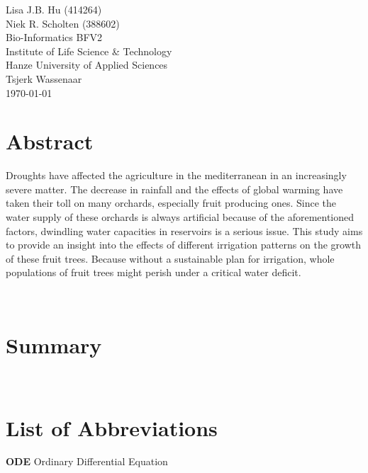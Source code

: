 \normalsize
\vspace*{\fill}
\begin{flushright}
Lisa J.B. Hu (414264)\\
Niek R. Scholten (388602)\\
Bio-Informatics BFV2\\
Institute of Life Science \& Technology\\
Hanze University of Applied Sciences\\
Tsjerk Wassenaar\\
\today
\end{flushright}
\newpage

\section*{Abstract}

Droughts have affected the agriculture in the mediterranean in an increasingly severe matter.
The decrease in rainfall and the effects of global warming have taken their toll on many orchards, especially fruit producing ones.
Since the water supply of these orchards is always artificial because of the aforementioned factors, dwindling water capacities in reservoirs is a serious issue.
This study aims to provide an insight into the effects of different irrigation patterns on the growth of these fruit trees.
Because without a sustainable plan for irrigation, whole populations of fruit trees might perish under a critical water deficit.

\label{sec:abstract}~
\newpage

\section*{Summary}

\label{sec:summ}~
\newpage

\section*{List of Abbreviations}

\textbf{ODE} Ordinary Differential Equation

\label{sec:abvs}~

\newpage